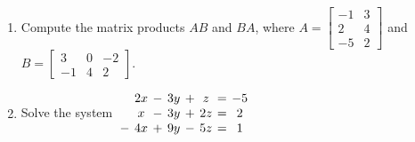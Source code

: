 \documentclass[12pt]{article}
\newcommand{\points}[1]{\marginpar{\hspace{24pt}[#1]}}
\begin{document}
\begin{enumerate}
\item Compute the matrix products $AB$ and $BA$, where $A = \begin{bmatrix}-1&3\\2&4\\-5&2\end{bmatrix}$ and $B = \begin{bmatrix}3&0&-2\\-1&4&2\end{bmatrix}$.\points{8}

\pagebreak

\item Solve the system \hspace{12pt} $\arraycolsep=2pt \begin{array}{cccccccc}&2x&-&3y&+&z&=&-5\\
 &x&-&3y&+&2z&=&2\\
-&4x&+&9y&-&5z&=&1\end{array}$ \points{8}
\end{enumerate}
\end{document}
